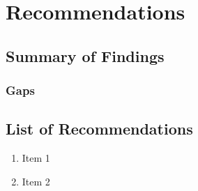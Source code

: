 \chapter{Recommendations}
\label{chap:recommendations}

\section{Summary of Findings}

\subsection{Gaps}

\section{List of Recommendations}

\begin{enumerate}
    \item Item 1
    \item Item 2
\end{enumerate}